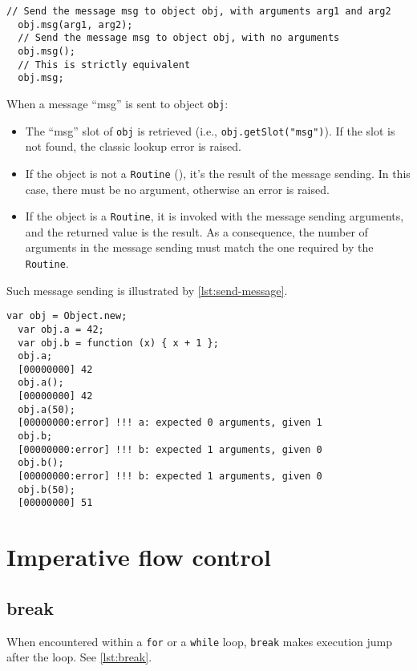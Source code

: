 \documentclass[openright,twoside,12pt]{report}
\begin{document}
\begin{lstlisting}[caption=Sending messages, label=lst:messages,
  float=\floatpos]
  // Send the message msg to object obj, with arguments arg1 and arg2
  obj.msg(arg1, arg2);
  // Send the message msg to object obj, with no arguments
  obj.msg();
  // This is strictly equivalent
  obj.msg;
\end{lstlisting}

When a message ``msg'' is sent to object \lstinline|obj|:

\begin{itemize}
\item The ``msg'' slot of \lstinline|obj| is retrieved (i.e.,
  \lstinline|obj.getSlot("msg")|). If the slot is not found, the
  classic lookup error is raised.
\item If the object is not a \lstinline|Routine| (), it's
  the result of the message sending. In this case, there must be no
  argument, otherwise an error is raised.
\item If the object is a \lstinline|Routine|, it is invoked with the
  message sending arguments, and the returned value is the result. As
  a consequence, the number of arguments in the message sending must
  match the one required by the \lstinline|Routine|.
\end{itemize}

Such message sending is illustrated by \autoref{lst:send-message}.

\begin{lstlisting}[caption=Sending messages, label=lst:send-message,
  float=\floatpos]
  var obj = Object.new;
  var obj.a = 42;
  var obj.b = function (x) { x + 1 };
  obj.a;
  [00000000] 42
  obj.a();
  [00000000] 42
  obj.a(50);
  [00000000:error] !!! a: expected 0 arguments, given 1
  obj.b;
  [00000000:error] !!! b: expected 1 arguments, given 0
  obj.b();
  [00000000:error] !!! b: expected 1 arguments, given 0
  obj.b(50);
  [00000000] 51
\end{lstlisting}

\FloatBarrier
\section{Imperative flow control}

\subsection{break}

When encountered within a \lstinline|for| or a \lstinline|while| loop,
\lstinline|break| makes execution jump after the loop. See
\autoref{lst:break}.
\end{document}
